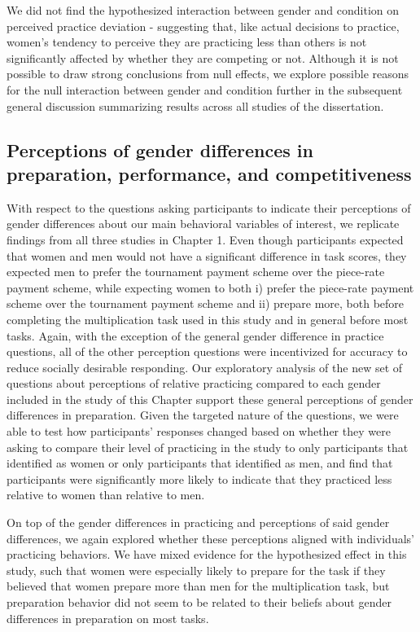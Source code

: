 \documentclass[a4paper, nobind]{templates/ociamthesis}
\begin{document}
We did not find the hypothesized interaction between gender and condition on perceived practice deviation - suggesting that, like actual decisions to practice, women's tendency to perceive they are practicing less than others is not significantly affected by whether they are competing or not. Although it is not possible to draw strong conclusions from null effects, we explore possible reasons for the null interaction between gender and condition further in the subsequent general discussion summarizing results across all studies of the dissertation.

\hypertarget{perceptions-of-gender-differences-in-preparation-performance-and-competitiveness-6}{%
\subsection{Perceptions of gender differences in preparation, performance, and competitiveness}\label{perceptions-of-gender-differences-in-preparation-performance-and-competitiveness-6}}

With respect to the questions asking participants to indicate their perceptions of gender differences about our main behavioral variables of interest, we replicate findings from all three studies in Chapter 1. Even though participants expected that women and men would not have a significant difference in task scores, they expected men to prefer the tournament payment scheme over the piece-rate payment scheme, while expecting women to both i) prefer the piece-rate payment scheme over the tournament payment scheme and ii) prepare more, both before completing the multiplication task used in this study and in general before most tasks. Again, with the exception of the general gender difference in practice questions, all of the other perception questions were incentivized for accuracy to reduce socially desirable responding. Our exploratory analysis of the new set of questions about perceptions of relative practicing compared to each gender included in the study of this Chapter support these general perceptions of gender differences in preparation. Given the targeted nature of the questions, we were able to test how participants' responses changed based on whether they were asking to compare their level of practicing in the study to only participants that identified as women or only participants that identified as men, and find that participants were significantly more likely to indicate that they practiced less relative to women than relative to men.

On top of the gender differences in practicing and perceptions of said gender differences, we again explored whether these perceptions aligned with individuals' practicing behaviors. We have mixed evidence for the hypothesized effect in this study, such that women were especially likely to prepare for the task if they believed that women prepare more than men for the multiplication task, but preparation behavior did not seem to be related to their beliefs about gender differences in preparation on most tasks.
\end{document}
